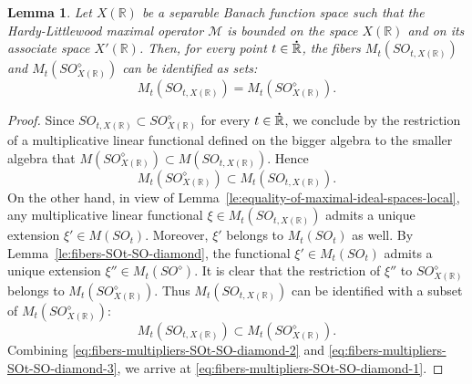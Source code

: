 \documentclass{birkjour}
\newtheorem{lemma}[theorem]{Lemma}
\numberwithin{equation}{section}
\newcommand{\R}{\mathbb{R}}
\newcommand{\cM}{\mathcal{M}}
\newcommand{\dR}{{\bf\dot{\R}}}
\begin{document}
\begin{lemma}\label{le:fibers-multipliers-SOt-SO-diamond}
Let $X(\R)$ be a separable Banach function space such that the Hardy-Littlewood
maximal operator $\cM$ is bounded on the space $X(\R)$ and on its associate
space $X'(\R)$. Then, for every point $t\in\dR$, the fibers
$M_t(SO_{t,X(\R)})$ and $M_t(SO_{X(\R)}^\diamond)$ can be identified as sets:
\begin{equation}\label{eq:fibers-multipliers-SOt-SO-diamond-1}
M_t(SO_{t,X(\R)})=M_t(SO_{X(\R)}^\diamond).
\end{equation}
\end{lemma}
\begin{proof}
Since $SO_{t,X(\R)}\subset SO_{X(\R)}^\diamond$ for every $t\in\dR$, we
conclude by the restriction of a multiplicative linear functional defined on
the bigger algebra to the smaller algebra that
$M(SO_{X(\R)}^\diamond)\subset M(SO_{t,X(\R)})$. Hence
\begin{equation}\label{eq:fibers-multipliers-SOt-SO-diamond-2}
M_t(SO_{X(\R)}^\diamond)\subset M_t(SO_{t,X(\R)}).
\end{equation}
On the other hand, in view of
Lemma~\ref{le:equality-of-maximal-ideal-spaces-local}, any
multiplicative linear functional $\xi\in M_t(SO_{t,X(\R)})$ admits a
unique extension $\xi'\in M(SO_t)$. Moreover,
$\xi'$ belongs to $M_t(SO_t)$ as well.
By Lemma~\ref{le:fibers-SOt-SO-diamond}, the functional
$\xi'\in M_t(SO_t)$ admits a unique extension $\xi''\in M_t(SO^\diamond)$.
It is clear that the restriction of $\xi''$ to $SO_{X(\R)}^\diamond$
belongs to $M_t(SO_{X(\R)}^\diamond)$. Thus $M_t(SO_{t,X(\R)})$
can be identified with a subset of $M_t(SO_{X(\R)}^\diamond)$:
\begin{equation}\label{eq:fibers-multipliers-SOt-SO-diamond-3}
M_t(SO_{t,X(\R)})\subset M_t(SO_{X(\R)}^\diamond).
\end{equation}
Combining \eqref{eq:fibers-multipliers-SOt-SO-diamond-2} and
\eqref{eq:fibers-multipliers-SOt-SO-diamond-3}, we arrive at
\eqref{eq:fibers-multipliers-SOt-SO-diamond-1}.
\end{proof}
\end{document}
